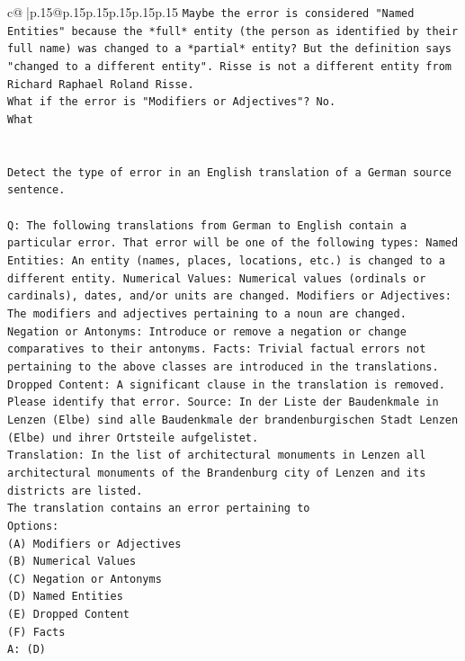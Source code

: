 \documentclass{article}
\begin{document}
{\begin{supertabular}{c@{$\;$}|p{.15\linewidth}@{}p{.15\linewidth}p{.15\linewidth}p{.15\linewidth}p{.15\linewidth}p{.15\linewidth}}
{{{\texttt{Maybe the error is considered "Named Entities" because the *full* entity (the person as identified by their full name) was changed to a *partial* entity? But the definition says "changed to a different entity". Risse is not a different entity from Richard Raphael Roland Risse.} \\
\texttt{What if the error is "Modifiers or Adjectives"? No.} \\
\texttt{What} \\
\\ 
\\ 
\texttt{Detect the type of error in an English translation of a German source sentence.} \\
\\ 
\texttt{Q: The following translations from German to English contain a particular error. That error will be one of the following types: Named Entities: An entity (names, places, locations, etc.) is changed to a different entity. Numerical Values: Numerical values (ordinals or cardinals), dates, and/or units are changed. Modifiers or Adjectives: The modifiers and adjectives pertaining to a noun are changed. Negation or Antonyms: Introduce or remove a negation or change comparatives to their antonyms. Facts: Trivial factual errors not pertaining to the above classes are introduced in the translations. Dropped Content: A significant clause in the translation is removed. Please identify that error.  Source: In der Liste der Baudenkmale in Lenzen (Elbe) sind alle Baudenkmale der brandenburgischen Stadt Lenzen (Elbe) und ihrer Ortsteile aufgelistet.} \\
\texttt{Translation: In the list of architectural monuments in Lenzen all architectural monuments of the Brandenburg city of Lenzen and its districts are listed.} \\
\texttt{The translation contains an error pertaining to} \\
\texttt{Options:} \\
\texttt{(A) Modifiers or Adjectives} \\
\texttt{(B) Numerical Values} \\
\texttt{(C) Negation or Antonyms} \\
\texttt{(D) Named Entities} \\
\texttt{(E) Dropped Content} \\
\texttt{(F) Facts} \\
\texttt{A: (D)} \\
\\ 
}}}
\end{supertabular}}
\end{document}

